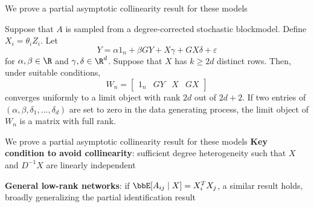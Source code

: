 \documentclass[aspectratio=169]{beamer}
\theoremstyle{remark}
\begin{document}
\begin{frame}{We prove a partial asymptotic collinearity result for these models}
    \begin{theorem}
        Suppose that $A$ is sampled from a degree-corrected stochastic blockmodel. Define $X_i = \theta_i Z_i$. Let 
        \begin{equation*}
            Y = \alpha 1_n + \beta G Y + X \gamma + G X \delta + \varepsilon
        \end{equation*}
        for $\alpha, \beta \in \R$ and $\gamma, \delta \in \R^d$. Suppose that $X$ has $k \ge 2d$ distinct rows. Then, under suitable conditions,
        \begin{equation*}
            W_n = \begin{bmatrix}
                1_n & GY & X & GX
            \end{bmatrix}
        \end{equation*}
        converges uniformly to a limit object with rank $2d$ out of $2d + 2$. If two entries of $(\alpha, \beta, \delta_1, ..., \delta_d)$ are set to zero in the data generating process, the limit object of $W_n$ is a matrix with full rank.
    \end{theorem}
\end{frame}

\begin{frame}{We prove a partial asymptotic collinearity result for these models}
    \textbf{Key condition to avoid collinearity}: sufficient degree heterogeneity such that $X$ and $D^{-1} X$ are linearly independent
    
    \vspace{4mm}
    \textbf{General low-rank networks}: if $\bbE[ A_{ij} \mid X ] = X_i^T X_j$, a similar result holds, broadly generalizing the partial identification result
\end{frame}
\end{document}
